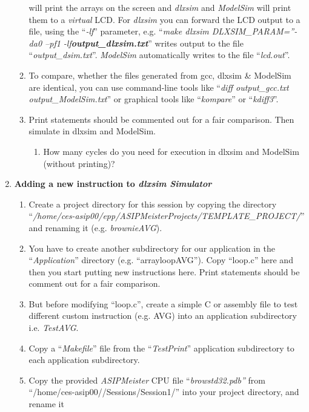 \begin{enumerate}
\begin{enumerate}
		will print the arrays on the screen and \emph{dlxsim} and
		\emph{ModelSim} will print them to a \emph{virtual} LCD. For
		\emph{dlxsim} you can forward the LCD output to a file, using the
		``\emph{-lf}'' parameter, e.g. ``\emph{make dlxsim
			DLXSIM\_PARAM=''-da0 --pf1 -lf\textbf{output\_dlxsim.txt}}'' writes
		output to the file ``\emph{output\_dsim.txt}''. \emph{ModelSim}
		automatically writes to the file ``\emph{lcd.out}''.
		\item
		To compare, whether the files generated from gcc, dlxsim \& ModelSim
		are identical, you can use command-line tools like ``\emph{diff
			output\_gcc.txt output\_ModelSim.txt}'' or graphical tools like
		``\emph{kompare}'' or ``\emph{kdiff3}''.
		\item
		Print statements should be commented out for a fair comparison. Then
		simulate in dlxsim and ModelSim.
		\begin{enumerate}[label=(\alph*)]
			\color{red}\item\normalcolor
			How many cycles do you need for execution in dlxsim and ModelSim
			(without printing)?
		\end{enumerate}
	\end{enumerate}
\item \textbf{Adding a new instruction to \emph{dlxsim Simulator}}
	\begin{enumerate}
		\def\labelenumii{\arabic{enumii}.}
		\item
		Create a project directory for this session by copying the directory
		``\emph{/home/ces-asip00/­epp/ASIP­Meister­Projects/TEMPLATE\_PROJECT/}''
		and renaming it (e.g. \emph{brownieAVG}).
		\item
		You have to create another subdirectory for our application in the
		``\emph{Application}'' directory (e.g. ``arrayloopAVG''). Copy
		``loop.c'' here and then you start putting new instructions here.
		Print statements should be comment out for a fair comparison.
		\item
		But before modifying ``loop.c'', create a simple C or assembly file
		to test different custom instruction (e.g. AVG) into an application
		subdirectory i.e. \emph{TestAVG}.
		\item
		Copy a ``\emph{Makefile}'' file from the ``\emph{TestPrint}''
		application subdirectory to each application subdirectory.
		\item
		Copy the provided \emph{ASIPMeister} CPU file
		``\emph{browstd32.pdb''} from ``/home/ces-asip00//Sessions/Session1/''
		into your project directory, and rename it

\end{enumerate}
\end{enumerate}
